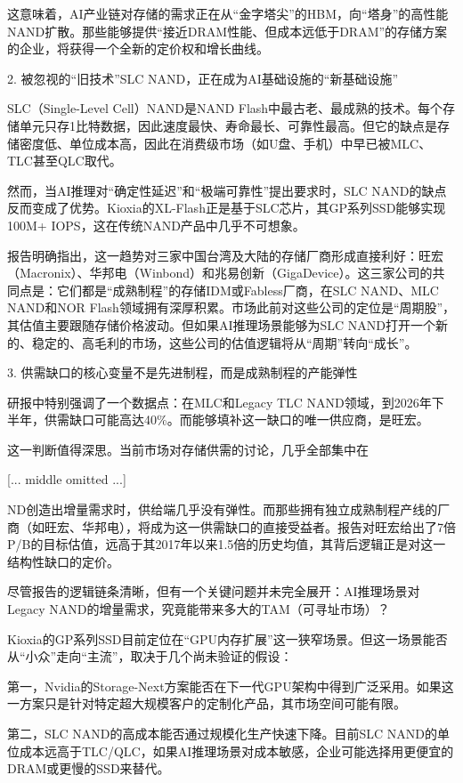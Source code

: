 \documentclass[11pt]{ctexart}
\begin{document}
这意味着，AI产业链对存储的需求正在从“金字塔尖”的HBM，向“塔身”的高性能NAND扩散。那些能够提供“接近DRAM性能、但成本远低于DRAM”的存储方案的企业，将获得一个全新的定价权和增长曲线。

2. 被忽视的“旧技术”SLC NAND，正在成为AI基础设施的“新基础设施”

SLC（Single-Level Cell）NAND是NAND Flash中最古老、最成熟的技术。每个存储单元只存1比特数据，因此速度最快、寿命最长、可靠性最高。但它的缺点是存储密度低、单位成本高，因此在消费级市场（如U盘、手机）中早已被MLC、TLC甚至QLC取代。

然而，当AI推理对“确定性延迟”和“极端可靠性”提出要求时，SLC NAND的缺点反而变成了优势。Kioxia的XL-Flash正是基于SLC芯片，其GP系列SSD能够实现100M+ IOPS，这在传统NAND产品中几乎不可想象。

报告明确指出，这一趋势对三家中国台湾及大陆的存储厂商形成直接利好：旺宏（Macronix）、华邦电（Winbond）和兆易创新（GigaDevice）。这三家公司的共同点是：它们都是“成熟制程”的存储IDM或Fabless厂商，在SLC NAND、MLC NAND和NOR Flash领域拥有深厚积累。市场此前对这些公司的定位是“周期股”，其估值主要跟随存储价格波动。但如果AI推理场景能够为SLC NAND打开一个新的、稳定的、高毛利的市场，这些公司的估值逻辑将从“周期”转向“成长”。

3. 供需缺口的核心变量不是先进制程，而是成熟制程的产能弹性

研报中特别强调了一个数据点：在MLC和Legacy TLC NAND领域，到2026年下半年，供需缺口可能高达40\%。而能够填补这一缺口的唯一供应商，是旺宏。

这一判断值得深思。当前市场对存储供需的讨论，几乎全部集中在

[... middle omitted ...]

ND创造出增量需求时，供给端几乎没有弹性。而那些拥有独立成熟制程产线的厂商（如旺宏、华邦电），将成为这一供需缺口的直接受益者。报告对旺宏给出了7倍P/B的目标估值，远高于其2017年以来1.5倍的历史均值，其背后逻辑正是对这一结构性缺口的定价。

尽管报告的逻辑链条清晰，但有一个关键问题并未完全展开：AI推理场景对Legacy NAND的增量需求，究竟能带来多大的TAM（可寻址市场）？

Kioxia的GP系列SSD目前定位在“GPU内存扩展”这一狭窄场景。但这一场景能否从“小众”走向“主流”，取决于几个尚未验证的假设：

第一，Nvidia的Storage-Next方案能否在下一代GPU架构中得到广泛采用。如果这一方案只是针对特定超大规模客户的定制化产品，其市场空间可能有限。

第二，SLC NAND的高成本能否通过规模化生产快速下降。目前SLC NAND的单位成本远高于TLC/QLC，如果AI推理场景对成本敏感，企业可能选择用更便宜的DRAM或更慢的SSD来替代。
\end{document}
